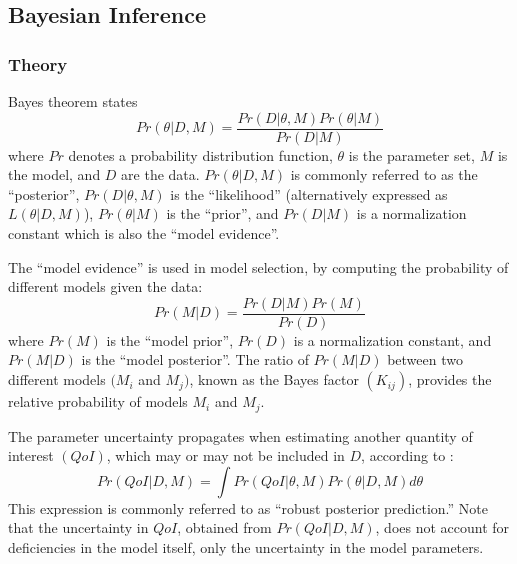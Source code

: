 \documentclass[preprint,letterpaper,floatfix,citeautoscript,aip,jcp]{revtex4-1}
\begin{document}
\subsection{Bayesian Inference} \label{Bayesian Analysis}

\subsubsection{Theory}

Bayes theorem states
\begin{equation} \label{Bayes Theorem}
Pr(\theta|D,M) = \frac{Pr(D|\theta,M)Pr(\theta|M)}{Pr(D|M)}
\end{equation}
where $Pr$ denotes a probability distribution function, $\theta$ is the parameter set, $M$ is the model, and $D$ are the data. $Pr(\theta|D,M)$ is commonly referred to as the ``posterior'', $Pr(D|\theta,M)$ is the ``likelihood'' (alternatively expressed as $L(\theta|D,M)$), $Pr(\theta|M)$ is the ``prior'', and $Pr(D|M)$ is a normalization constant which is also the ``model evidence''. 


The ``model evidence'' is used in model selection, by computing the probability of different models given the data:
\begin{equation} \label{Model Selection}
Pr(M|D) = \frac{Pr(D|M)Pr(M)}{Pr(D)}
\end{equation}
where $Pr(M)$ is the ``model prior'', $Pr(D)$ is a normalization constant, and $Pr(M|D)$ is the ``model posterior''. The ratio of $Pr(M|D)$ between two different models $(M_i$ and $M_j)$, known as the Bayes factor $(K_{ij})$, provides the relative probability of models $M_i$ and $M_j$. 

The parameter uncertainty propagates when estimating another quantity of interest $(QoI)$, which may or may not be included in $D$, according to \cite{Kulakova2017}:
\begin{equation} \label{Posterior Prediction}
Pr(QoI|D,M) = \int Pr(QoI|\theta,M) Pr(\theta|D,M) d\theta
\end{equation}
This expression is commonly referred to as ``robust posterior prediction.'' Note that the uncertainty in $QoI$, obtained from $Pr(QoI|D,M)$, does not account for deficiencies in the model itself, only the uncertainty in the model parameters.
\end{document}
